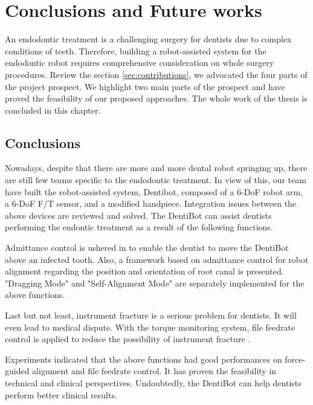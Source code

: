\chapter{Conclusions and Future works}
\hspace*{6mm}An endodontic treatment is a challenging surgery for dentists due to complex conditions of teeth. Therefore, building a robot-assisted system for the endodontic robot requires comprehensive consideration on whole surgery procedures. Review the section \ref{sec:contributions}, we advocated the four parts of the project prospect. We highlight two main parts of the prospect and have proved the feasibility of our proposed approaches. The whole work of the thesis is concluded in this chapter.
\section{Conclusions}
\hspace*{6mm}Nowadays, despite that there are more and more dental robot springing up, there are still few teams specific to the endodontic treatment. In view of this, our team have built the robot-assisted system, Dentibot, composed of a 6-DoF robot arm, a 6-DoF F/T sensor, and a modified handpiece. Integration issues between the above devices are reviewed and solved. The DentiBot can assist dentists performing the endontic treatment as a result of the following functions. 
\par
Admittance control is ushered in to enable the dentist to move the DentiBot above an infected tooth. Also, a framework based on admittance control for robot alignment regarding the position and orientation of root canal is presented. "Dragging Mode" and "Self-Alignment Mode" are separately implemented for the above functions.
\par
Last but not least, instrument fracture is a serious problem for dentists. It will even lead to medical dispute. With the torque monitoring system, file feedrate control is applied to reduce the possibility of instrument fracture . 
\par
Experiments indicated that the above functions had good performances on force-guided alignment and file feedrate control. It has proven the feasibility in technical and clinical perspectives. Undoubtedly, the DentiBot can help dentists perform better clinical results.
